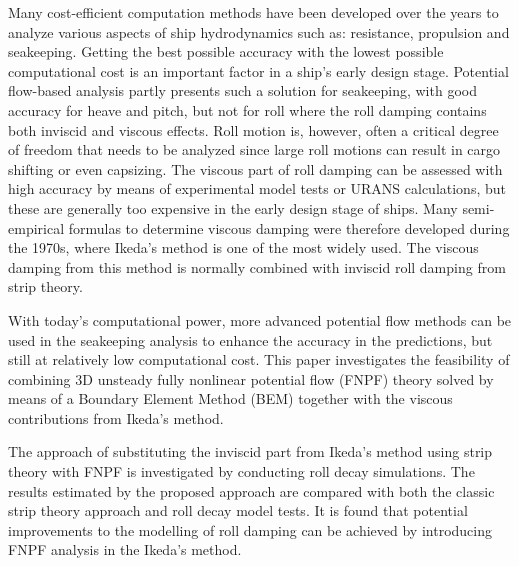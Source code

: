 Many cost-efficient computation methods have been developed over the years to analyze various aspects of ship hydrodynamics such as: resistance, propulsion and seakeeping. Getting the best possible accuracy with the lowest possible computational cost is an important factor in a ship’s early design stage. Potential flow-based analysis partly presents such a solution for seakeeping, with good accuracy for heave and pitch, but not for roll where the roll damping contains both inviscid and viscous effects. Roll motion is, however, often a critical degree of freedom that needs to be analyzed since large roll motions can result in cargo shifting or even capsizing. 
The viscous part of roll damping can be assessed with high accuracy by means of experimental model tests or URANS calculations, but these are generally too expensive in the early design stage of ships. Many semi-empirical formulas to determine viscous damping were therefore developed during the 1970s, where Ikeda’s method is one of the most widely used.
The viscous damping from this method is normally combined with inviscid roll damping from strip theory.

With today’s computational power, more advanced potential flow methods can be used in the seakeeping analysis to enhance the accuracy in the predictions, but still at relatively low computational cost. This paper investigates the feasibility of combining 3D unsteady fully nonlinear potential flow (FNPF) theory solved by means of a Boundary Element Method (BEM) together with the viscous contributions from Ikeda’s method.

The approach of substituting the inviscid part from Ikeda’s method using strip theory with FNPF is investigated by conducting roll decay simulations. The results estimated by the proposed approach are compared with both the classic strip theory approach and roll decay model tests. It is found that potential improvements to the modelling of roll damping can be achieved by introducing FNPF analysis in the Ikeda’s method.

